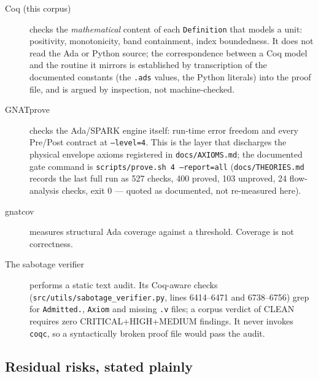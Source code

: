 \documentclass[11pt]{article}
\theoremstyle{definition}
\begin{document}
\begin{description}
\item[Coq (this corpus)] checks the \emph{mathematical} content of each
\texttt{Definition} that models a unit: positivity, monotonicity, band
containment, index boundedness. It does not read the Ada or Python source;
the correspondence between a Coq model and the routine it mirrors is
established by transcription of the documented constants (the \texttt{.ads}
values, the Python literals) into the proof file, and is argued by
inspection, not machine-checked.
\item[GNATprove] checks the Ada/SPARK engine itself: run-time error freedom
and every Pre/Post contract at \texttt{--level=4}. This is the layer that
discharges the physical envelope axioms registered in
\texttt{docs/AXIOMS.md}; the documented gate command is
\texttt{scripts/prove.sh\ 4\ --report=all} (\texttt{docs/THEORIES.md}
records the last full run as 527 checks, 400 proved, 103 unproved, 24
flow-analysis checks, exit 0 --- quoted as documented, not re-measured
here).
\item[gnatcov] measures structural Ada coverage against a threshold.
Coverage is not correctness.
\item[The sabotage verifier] performs a static text audit. Its Coq-aware
checks (\texttt{src/utils/sabotage\_verifier.py}, lines 6414--6471 and
6738--6756) grep for \texttt{Admitted.}, \texttt{Axiom} and missing
\texttt{.v} files; a corpus verdict of CLEAN requires zero
CRITICAL+HIGH+MEDIUM findings. It never invokes \texttt{coqc}, so a
syntactically broken proof file would pass the audit.
\end{description}

\subsection{Residual risks, stated plainly}
\end{document}
